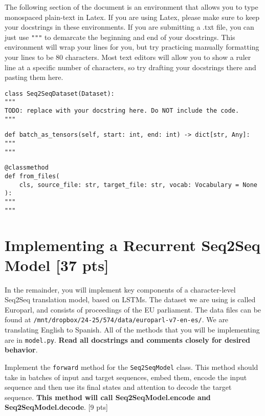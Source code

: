 \documentclass[11pt]{article}
\begin{document}
The following section of the document is an environment that allows you to type monospaced plain-text in Latex. If you are using Latex, please make sure to keep your docstrings in these environments. If you are submitting a .txt file, you can just use \texttt{"""} to demarcate the beginning and end of your docstrings. This environment will wrap your lines for you, but try practicing manually formatting your lines to be 80 characters. Most text editors will allow you to show a ruler line at a specific number of characters, so try drafting your docstrings there and pasting them here.

\begin{lstlisting}
class Seq2SeqDataset(Dataset):
"""
TODO: replace with your docstring here. Do NOT include the code.
"""
\end{lstlisting}

\begin{lstlisting}
def batch_as_tensors(self, start: int, end: int) -> dict[str, Any]:
"""
"""
\end{lstlisting}

\begin{lstlisting}
@classmethod
def from_files(
    cls, source_file: str, target_file: str, vocab: Vocabulary = None
):
"""
"""
\end{lstlisting}

\section{Implementing a Recurrent Seq2Seq Model [37 pts]}

In the remainder, you will implement key components of a character-level Seq2Seq translation model, based on LSTMs. The dataset we are using is called Europarl, and consists of proceedings of the EU parliament. The data files can be found at \texttt{/mnt/dropbox/24-25/574/data/europarl-v7-en-es/}. We are translating English to Spanish. All of the methods that you will be implementing are in \texttt{model.py}. \textbf{Read all docstrings and comments closely for desired behavior}.

\vspace{2em}
 Implement the \texttt{forward} method for the \texttt{Seq2SeqModel} class. This method should take in batches of input and target sequences, embed them, encode the input sequence and then use its final states and attention to decode the target sequence. \textbf{This method will call Seq2SeqModel.encode and Seq2SeqModel.decode}. \hfill [9 pts]
\end{document}
